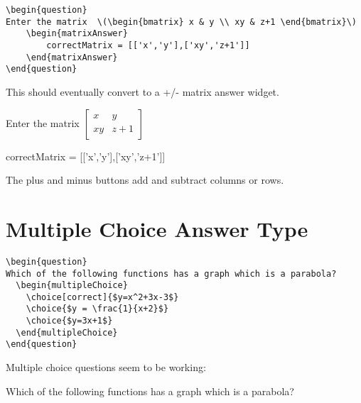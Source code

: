 \documentclass{ximera}
\begin{document}
\begin{verbatim}
\begin{question}
Enter the matrix  \(\begin{bmatrix} x & y \\ xy & z+1 \end{bmatrix}\)
    \begin{matrixAnswer}
	    correctMatrix = [['x','y'],['xy','z+1']]
    \end{matrixAnswer}
\end{question}
\end{verbatim}

This should eventually convert to a +/- matrix answer widget.

\begin{question}
  Enter the matrix  \(\begin{bmatrix} x & y \\ xy & z+1 \end{bmatrix}\)
\begin{matrixAnswer}
    correctMatrix = [['x','y'],['xy','z+1']]
\end{matrixAnswer}
\end{question}

\begin{remark}
  The plus and minus buttons add and subtract columns or rows.  
\end{remark}



\section{Multiple Choice Answer Type}

\begin{verbatim}
\begin{question}
Which of the following functions has a graph which is a parabola?
  \begin{multipleChoice}
    \choice[correct]{$y=x^2+3x-3$}
    \choice{$y = \frac{1}{x+2}$}
    \choice{$y=3x+1$}
  \end{multipleChoice}
\end{question}
\end{verbatim}

Multiple choice questions seem to be working:

\begin{question}
  Which of the following functions has a graph which is a parabola?
  \begin{multipleChoice}
  \end{multipleChoice}
\end{question}
\end{document}
